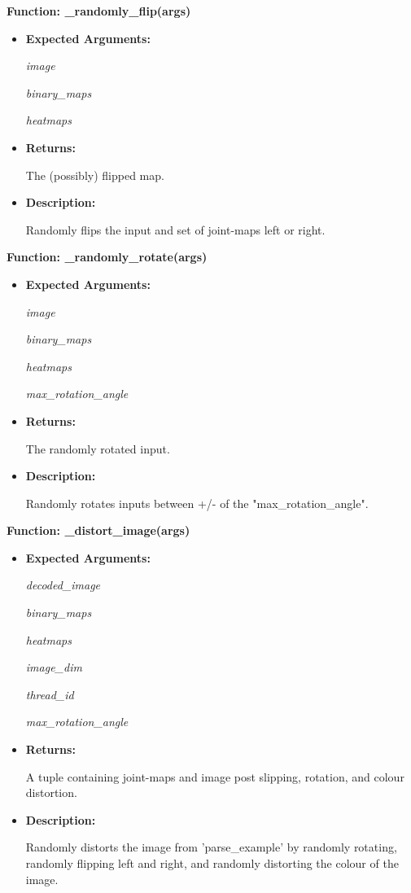 \documentclass{scrreprt}
\begin{document}
\textbf{Function: \_randomly\_flip(args)}
\begin{itemize}
    \item \textbf{Expected Arguments:}

            \quad\textit{image}

            \quad\textit{binary\_maps}

            \quad\textit{heatmaps}

    \item \textbf{Returns:}

            The (possibly) flipped map.

    \item \textbf{Description:}

            Randomly flips the input and set of joint-maps left or right.

\end{itemize}

\textbf{Function: \_randomly\_rotate(args)}
\begin{itemize}
    \item \textbf{Expected Arguments:}

            \quad\textit{image}

            \quad\textit{binary\_maps}

            \quad\textit{heatmaps}

            \quad\textit{max\_rotation\_angle}

    \item \textbf{Returns:}

            The randomly rotated input.

    \item \textbf{Description:}

            Randomly rotates inputs between +/- of the "max\_rotation\_angle".

\end{itemize}

\textbf{Function: \_distort\_image(args)}
\begin{itemize}
    \item \textbf{Expected Arguments:}

            \quad\textit{decoded\_image}

            \quad\textit{binary\_maps}

            \quad\textit{heatmaps}

            \quad\textit{image\_dim}

            \quad\textit{thread\_id}

            \quad\textit{max\_rotation\_angle}

    \item \textbf{Returns:}

            A tuple containing joint-maps and image post slipping, rotation, and colour distortion.

    \item \textbf{Description:}

            Randomly distorts the image from 'parse\_example' by randomly rotating, randomly flipping left and right, and randomly distorting the colour of the image.

\end{itemize}
\end{document}
